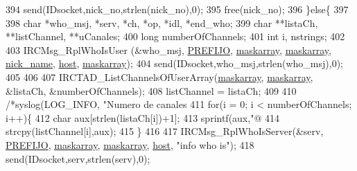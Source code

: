 \begin{DoxyCode}
{{{{394                                 send(IDsocket,nick\_no,strlen(nick\_no),0);
395                                 free(nick\_no);
396                         \}\textcolor{keywordflow}{else}\{
397 
398                                 \textcolor{keywordtype}{char} *who\_msj, *serv, *ch, *op, *idl, *end\_who;
399                                 \textcolor{keywordtype}{char} **listaCh, **listChannel, **uCanales;
400                                 \textcolor{keywordtype}{long} numberOfChannels;
401                                 \textcolor{keywordtype}{int} i, nstrings;
402 
403                                 IRCMsg\_RplWhoIsUser (&who\_msj, \hyperlink{_g-2361-06-_p1-_server_8h_a78c658ff923693099f7b621e7c351129}{PREFIJO}, 
      \hyperlink{_g-2361-06-_p1-_server_8c_ad51a4303b7c769561b12bf04a68bc042}{maskarray}, \hyperlink{_g-2361-06-_p1-_server_8c_ad51a4303b7c769561b12bf04a68bc042}{maskarray}, \hyperlink{_g-2361-06-_p1-_server_8c_aabbf66718cda228b924a4a9441eadf62}{nick\_name}, \hyperlink{_g-2361-06-_p1-_server_8c_a1c2046dcb30a629d6d9f45ff8f403f12}{host}, \hyperlink{_g-2361-06-_p1-_server_8c_ad51a4303b7c769561b12bf04a68bc042}{maskarray});
404                                 send(IDsocket,who\_msj,strlen(who\_msj),0);
405 
406 
407                                 IRCTAD\_ListChannelsOfUserArray(\hyperlink{_g-2361-06-_p1-_server_8c_ad51a4303b7c769561b12bf04a68bc042}{maskarray}, 
      \hyperlink{_g-2361-06-_p1-_server_8c_ad51a4303b7c769561b12bf04a68bc042}{maskarray}, &listaCh, &numberOfChannels);
408                                 listChannel = listaCh;
409 
410                                 \textcolor{comment}{/*syslog(LOG\_INFO, "Numero de canales %
411                                 \textcolor{keywordflow}{for}(i = 0; i < numberOfChannels; i++)\{
412                                         \textcolor{keywordtype}{char} aux[strlen(listaCh[i])+1];
413                                         sprintf(aux,\textcolor{stringliteral}{"@%
414                                         strcpy(listChannel[i],aux);
415                                 \}
416 
417                                 IRCMsg\_RplWhoIsServer(&serv, \hyperlink{_g-2361-06-_p1-_server_8h_a78c658ff923693099f7b621e7c351129}{PREFIJO}, 
      \hyperlink{_g-2361-06-_p1-_server_8c_ad51a4303b7c769561b12bf04a68bc042}{maskarray}, \hyperlink{_g-2361-06-_p1-_server_8c_ad51a4303b7c769561b12bf04a68bc042}{maskarray}, \hyperlink{_g-2361-06-_p1-_server_8c_a1c2046dcb30a629d6d9f45ff8f403f12}{host}, \textcolor{stringliteral}{"info who is"});
418                                 send(IDsocket,serv,strlen(serv),0);
}}}}}}
\end{DoxyCode}
